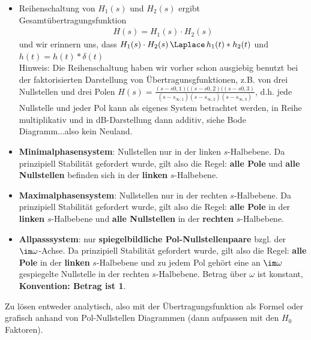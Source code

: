 \begin{Werkzeug}
\begin{itemize}
  \item Reihenschaltung von $H_1(s)$ und $H_2(s)$ ergibt Gesamtübertragungsfunktion
  \begin{align}
    H(s) = H_1(s) \cdot H_2(s)
  \end{align}
  und wir erinnern uns, dass $H_1(s)\cdot H_2(s) \,\Laplace\, h_1(t)\ast h_2(t)$
  und $h(t) = h(t)\ast \delta(t)$\\
  Hinweis: Die Reihenschaltung haben wir vorher schon ausgiebig benutzt bei der faktorisierten
  Darstellung von Übertragunsgfunktionen, z.B. von drei Nullstellen und drei Polen
  $H(s) = \frac{(s-s{0,1})((s-s{0,2})((s-s{0,3})}{(s-s_{\infty,1})(s-s_{\infty,2})(s-s_{\infty,3})}$,
  d.h. jede Nullstelle und jeder Pol kann als eigenes System betrachtet werden, in Reihe
  multiplikativ und in dB-Darstellung dann additiv, siehe Bode Diagramm...also kein
  Neuland.
  \item \textbf{Minimalphasensystem}: Nullstellen nur in der linken $s$-Halbebene. Da prinzipiell
  Stabilität gefordert wurde, gilt also die Regel: \textbf{alle Pole} und \textbf{alle Nullstellen}
  befinden sich in der \textbf{linken} $s$-Halbebene.
  \item \textbf{Maximalphasensystem}: Nullstellen nur in der rechten $s$-Halbebene. Da prinzipiell
  Stabilität gefordert wurde, gilt also die Regel: \textbf{alle Pole} in der \textbf{linken}
  $s$-Halbebene und \textbf{alle Nullstellen} in der \textbf{rechten} $s$-Halbebene.
  \item \textbf{Allpasssystem}: nur \textbf{spiegelbildliche Pol-Nullstellenpaare} bzgl.
  der $\im\omega$-Achse. Da prinzipiell Stabilität gefordert wurde, gilt also
  die Regel: \textbf{alle Pole} in der \textbf{linken} $s$-Halbebene und zu jedem Pol gehört
  eine an $\im\omega$ gespiegelte Nullstelle in der rechten $s$-Halbebene.
  Betrag über $\omega$ ist konstant, \textbf{Konvention: Betrag ist 1}.
\end{itemize}


\end{Werkzeug}
\begin{Ansatz}
Zu lösen entweder analytisch, also mit der Übertragungsfunktion als Formel
oder grafisch anhand von Pol-Nullstellen Diagrammen (dann aufpassen
mit den $H_0$ Faktoren).
\end{Ansatz}

